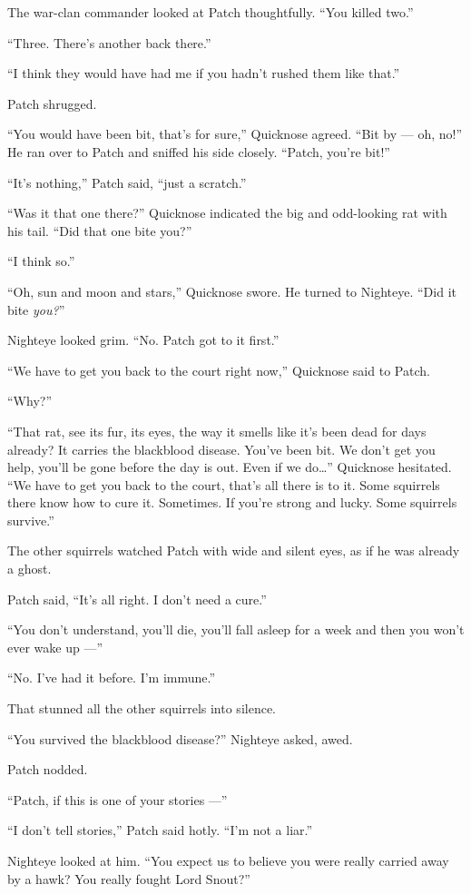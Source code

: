\documentclass[ebook,oneside,openany,17pt]{memoir}
\begin{document}
The war-clan commander looked at Patch thoughtfully. “You killed two.”

“Three. There’s another back there.”

“I think they would have had me if you hadn’t rushed them like that.”

Patch shrugged.

“You would have been bit, that’s for sure,” Quicknose agreed. “Bit by
— oh, no!” He ran over to Patch and sniffed his side closely. “Patch,
you’re bit!”

“It’s nothing,” Patch said, “just a scratch.”

“Was it that one there?” Quicknose indicated the big and odd-looking
rat with his tail. “Did that one bite you?”

“I think so.”

“Oh, sun and moon and stars,” Quicknose swore. He turned to
Nighteye. “Did it bite \emph{you?}”

Nighteye looked grim. “No. Patch got to it first.”

“We have to get you back to the court right now,” Quicknose said to
Patch.

“Why?”

“That rat, see its fur, its eyes, the way it smells like it’s been
dead for days already? It carries the blackblood disease. You’ve been
bit. We don’t get you help, you’ll be gone before the day is out. Even
if we do…” Quicknose hesitated. “We have to get you back to the court,
that’s all there is to it. Some squirrels there know how to cure
it. Sometimes. If you’re strong and lucky. Some squirrels survive.”

The other squirrels watched Patch with wide and silent eyes, as if he
was already a ghost.

Patch said, “It’s all right. I don’t need a cure.”

“You don’t understand, you’ll die, you’ll fall asleep for a week and
then you won’t ever wake up —”

“No. I’ve had it before. I’m immune.”

That stunned all the other squirrels into silence.

“You survived the blackblood disease?” Nighteye asked, awed.

Patch nodded.

“Patch, if this is one of your stories —”

“I don’t tell stories,” Patch said hotly. “I’m not a liar.”

Nighteye looked at him. “You expect us to believe you were really
carried away by a hawk? You really fought Lord Snout?”
\end{document}
